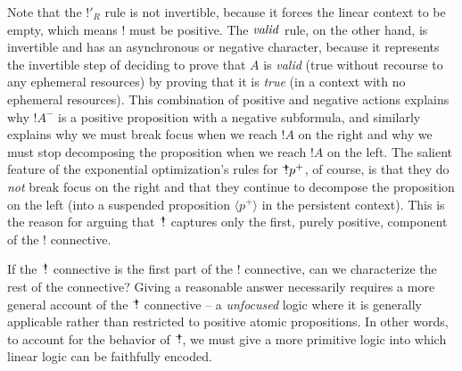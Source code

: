 Note that the ${!}'_R$ rule is not invertible,
because it forces the linear context to be empty, which means ${!}$
must be positive. The ${\it valid}$
rule, on the other hand, is invertible and has an
asynchronous or negative character,
because it represents the invertible step of deciding to prove that
$A$ is {\it valid} (true without recourse to any ephemeral resources)
by proving that it is {\it true}
(in a context with no ephemeral resources). This combination of
positive and negative actions explains why ${!}A^-$ is a positive
proposition with a negative subformula, and similarly explains why we
must break focus when we reach ${!}A$ on the right and why we must
stop decomposing the proposition when we reach ${!}A$ on the left.
The salient feature of the exponential optimization's rules for ${\mbox{\hspace{2pt}$\mathbb !$\hspace{-4.965pt}$^+$\hspace{-1pt}}}p^+$, of
course, is that they do {\it not} break focus on the right and that
they continue to decompose the proposition on the left (into a
suspended proposition $\langle p^+ \rangle$ in the persistent
context). This is the reason for arguing that ${\mbox{\hspace{2pt}$\mathbb !$\hspace{-4.965pt}$^+$\hspace{-1pt}}}$ captures only
the first, purely positive, component of the ${!}$ connective.

If the $\mbox{\hspace{2pt}$\mathbb !$\hspace{-4.965pt}$^+$\hspace{-1pt}}$ connective is the first part of the $!$ connective,
can we characterize the rest of the connective? Giving a reasonable
answer necessarily requires a more general account of the $\mbox{\hspace{2pt}$\mathbb !$\hspace{-4.965pt}$^+$\hspace{-1pt}}$
connective -- a {\it unfocused} logic where it is generally applicable
rather than restricted to positive atomic propositions. In other
words, to account for the behavior of $\mbox{\hspace{2pt}$\mathbb !$\hspace{-4.965pt}$^+$\hspace{-1pt}}$, we must give a more
primitive logic into which linear logic can be faithfully encoded.




